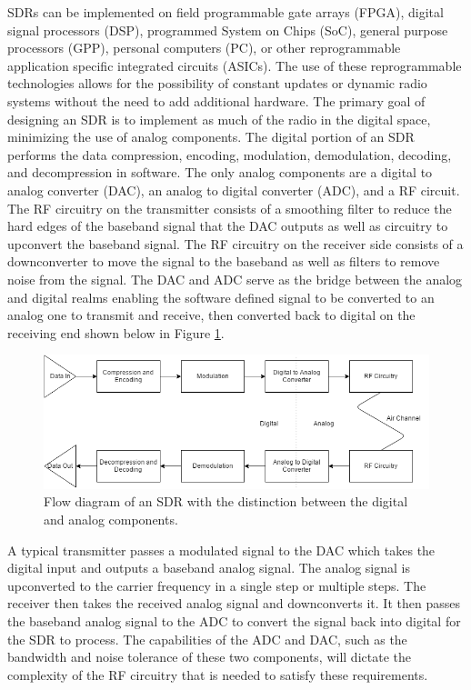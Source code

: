 SDRs can be implemented on field programmable gate arrays (FPGA), digital signal processors (DSP), programmed System on Chips (SoC), general purpose processors (GPP), personal computers (PC), or other reprogrammable application specific integrated circuits (ASICs). The use of these reprogrammable technologies allows for the possibility of constant updates or dynamic radio systems without the need to add additional hardware. The primary goal of designing an SDR is to implement as much of the radio in the digital space, minimizing the use of analog components. The digital portion of an SDR performs the data compression, encoding, modulation, demodulation, decoding, and decompression in software. The only analog components are a digital to analog converter (DAC), an analog to digital converter (ADC), and a RF circuit. The RF circuitry on the transmitter consists of a smoothing filter to reduce the hard edges of the baseband signal that the DAC outputs as well as circuitry to upconvert the baseband signal. The RF circuitry on the receiver side consists of a downconverter to move the signal to the baseband as well as filters to remove noise from the signal. The DAC and ADC serve as the bridge between the analog and digital realms enabling the software defined signal to be converted to an analog one to transmit and receive, then converted back to digital on the receiving end shown below in Figure \ref{fig:sdr_flow_diagram}.
\begin{figure}[ht]
\centering
\includegraphics[width=\textwidth]{img/sdr_diagram.png}
\caption{Flow diagram of an SDR with the distinction between the digital and analog components.}
\label{fig:sdr_flow_diagram}
\end{figure}\par
A typical transmitter passes a modulated signal to the DAC which takes the digital input and outputs a baseband analog signal. The analog signal is upconverted to the carrier frequency in a single step or multiple steps. The receiver then takes the received analog signal and downconverts it. It then passes the baseband analog signal to the ADC to convert the signal back into digital for the SDR to process. The capabilities of the ADC and DAC, such as the bandwidth and noise tolerance of these two components, will dictate the complexity of the RF circuitry that is needed to satisfy these requirements.\par
